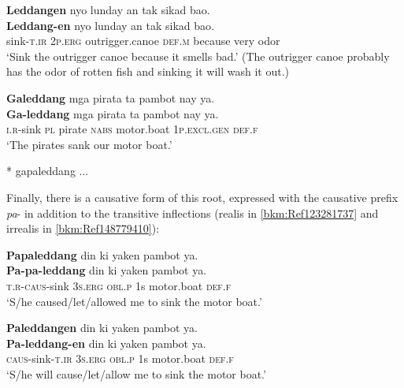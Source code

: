 \ea
\label{bkm:Ref123281189}
\textbf{Leddangen}  nyo  lunday  an  tak  sikad  bao. \\\smallskip
\gll \textbf{Leddang-en}  nyo  lunday  an  tak  sikad  bao. \\
sink-\textsc{t.ir}  2\textsc{p.erg}  outrigger.canoe  \textsc{def.m}  because  very  odor \\
\glt ‘Sink the outrigger canoe because it smells bad.’ (The outrigger canoe probably has the odor of rotten fish and sinking it will wash it out.)
\z

\ea
\label{bkm:Ref123281290}
\textbf{Galeddang}  mga  pirata  ta  pambot  nay  ya. \\\smallskip
\gll \textbf{Ga-leddang}  mga  pirata  ta  pambot  nay  ya. \\
\textsc{i.r}-sink  \textsc{pl}  pirate  \textsc{nabs}  motor.boat  1\textsc{p.excl.gen}  \textsc{def.f} \\
\glt ‘The pirates sank our motor boat.’\smallskip

* gapaleddang ...
\z

Finally, there is a causative form of this root, expressed with the causative prefix \textit{pa}{}- in addition to the transitive inflections (realis in \ref{bkm:Ref123281737} and irrealis in \ref{bkm:Ref148779410}):

\ea
\label{bkm:Ref123281737}
\textbf{Papaleddang}  din  ki  yaken  pambot  ya. \\\smallskip
\gll \textbf{Pa-pa-leddang}  din  ki  yaken  pambot  ya. \\
\textsc{t.r}-\textsc{caus}-sink  3\textsc{s.erg}  \textsc{obl.p}  1s  motor.boat  \textsc{def.f} \\
\glt ‘S/he caused/let/allowed me to sink the motor boat.’
\z

\ea
\label{bkm:Ref148779410}
\textbf{Paleddangen}  din  ki  yaken  pambot  ya. \\\smallskip
\gll \textbf{Pa-leddang-en}  din  ki  yaken  pambot  ya. \\
\textsc{caus}-sink-\textsc{t.ir}  3\textsc{s.erg}  \textsc{obl.p}  1s  motor.boat  \textsc{def.f} \\
\glt ‘S/he will cause/let/allow me to sink the motor boat.’
\z

